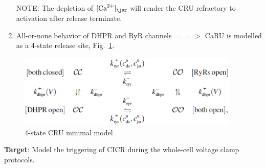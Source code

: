 \begin{enumerate}
NOTE: The depletion of $[\Ca]_\jsr$ will render the CRU refractory to
activation after release terminate. 

\item All-or-none behavior of DHPR and RyR channels $==>$ CaRU is
  modelled as a 4-state release site, Fig.~\ref{fig:Blair_CRU}.
\end{enumerate}

\begin{figure}[hbt]
  \centerline{\includegraphics[height=3.5cm,
    angle=0]{./images/Blair_CRU.eps}}
\caption{4-state CRU minimal model}
\label{fig:Blair_CRU}
\end{figure}


{\bf Target}: Model the triggering of CICR during the whole-cell
voltage clamp protocols.








